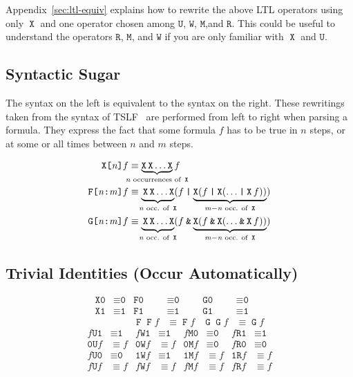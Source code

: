 \documentclass[a4paper,twoside,10pt,DIV=12]{scrreprt}
\DeclareMathOperator{\F}{\texttt{F}}
\newcommand{\FREP}[1]{\texttt{F[#1]}}
\DeclareMathOperator{\G}{\texttt{G}}
\newcommand{\GREP}[1]{\texttt{G[#1]}}
\newcommand{\U}{\mathbin{\texttt{U}}}
\newcommand{\R}{\mathbin{\texttt{R}}}
\DeclareMathOperator{\X}{\texttt{X}}
\newcommand{\XREP}[1]{\texttt{X[#1]}}
\newcommand{\M}{\mathbin{\texttt{M}}}
\newcommand{\W}{\mathbin{\texttt{W}}}
\newcommand{\OR}{\mathbin{\texttt{|}}}
\newcommand{\AND}{\mathbin{\texttt{\&}}}
\newcommand{\0}{\texttt{0}}
\newcommand{\1}{\texttt{1}}
\def\clap#1{\hbox to 0pt{\hss#1\hss}}
\def\mathclap{\mathpalette\mathclapinternal}
\def\mathclapinternal#1#2{%
           \clap{$\mathsurround=0pt#1{#2}$}}
\newcommand\mvar[1]{\ensuremath{\mathit{#1}}}
\begin{document}
Appendix~\ref{sec:ltl-equiv} explains how to rewrite the above LTL
operators using only $\X$ and one operator chosen among $\U$, $\W$,
$\M$,and $\R$.  This could be useful to understand the operators $\R$,
$\M$, and $\W$ if you are only familiar with $\X$ and $\U$.

\subsection{Syntactic Sugar}

The syntax on the left is equivalent to the syntax on the right.
These rewritings taken from the syntax of TSLF~\citep{jacobs.16.synt}
are performed from left to right when parsing a formula.  They express
the fact that some formula $f$ has to be true in $n$ steps, or at some
or all times between $n$ and $m$ steps.

\begin{align*}
  \XREP{\mvar{n}} f
  & \equiv \underbrace{\X\X\ldots\X}_{\mathclap{\text{\mvar{n} occurrences of~}\X}} f \\
  \FREP{\mvar{n}:\mvar{m}}f
  & \equiv \underbrace{\vphantom{(}\X\X\ldots\X}_{\mathclap{\text{\mvar{n} occ. of~}\X}} (f \OR \underbrace{\X(f \OR \X(\ldots \OR \X f))}_{\mathclap{\mvar{m}-\mvar{n}\text{~occ. of~}\X}}) \\
  \GREP{\mvar{n}:\mvar{m}}f
  & \equiv \underbrace{\vphantom{(}\X\X\ldots\X}_{\mathclap{\text{\mvar{n} occ. of~}\X}} (f \AND \underbrace{\X(f \AND \X(\ldots \AND \X f))}_{\mathclap{\mvar{m}-\mvar{n}\text{~occ. of~}\X}}) \\
\end{align*}

\subsection{Trivial Identities (Occur Automatically)}

  \begin{align*}
    \X\0 &\equiv \0 &
    \F\0 &\equiv \0 &
    \G\0 &\equiv \0 \\
    \X\1 &\equiv \1 &
    \F\1 &\equiv \1 &
    \G\1 &\equiv \1 \\
               &                &
    \F\F f&\equiv \F f &
    \G\G f&\equiv \G f
  \end{align*}
  \begin{align*}
    f\U\1&\equiv \1 &
    f\W\1&\equiv \1 &
    f\M\0&\equiv \0 &
    f\R\1&\equiv \1 \\
    \0\U f&\equiv f &
    \0\W f&\equiv f &
    \0\M f&\equiv \0 &
    f\R\0&\equiv \0 \\
    f\U\0&\equiv \0 &
    \1\W f&\equiv \1 &
    \1\M f&\equiv f &
    \1\R f&\equiv f \\
    f\U f&\equiv f &
    f\W f&\equiv f &
    f\M f&\equiv f &
    f\R f&\equiv f
  \end{align*}
\end{document}
